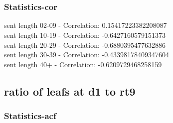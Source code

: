 \documentclass{article}%
\begin{document}
\begin{figure}[ht]%
\centering%
\setlength{\abovecaptionskip}{-35pt}%
%
%
\\%
%
%
\\%
%
\end{figure}

%
\newpage%
\subsubsection{Statistics{-}cor}%
\label{ssubsec:Statistics{-}cor}%
\noindent%
sent length 02-09 - Correlation: 0.15417223382208087\\%
sent length 10-19 - Correlation: -0.6427160579151373\\%
sent length 20-29 - Correlation: -0.6880395477632886\\%
sent length 30-39 - Correlation: -0.43398178409347604\\%
sent length 40+ - Correlation: -0.6209729468258159\\

%
\newpage

%
\subsection{ratio of leafs at d1 to rt9}%
\label{subsec:ratioofleafsatd1tort9}%
\subsubsection{Statistics{-}acf}%
\label{ssubsec:Statistics{-}acf}%
\end{document}
